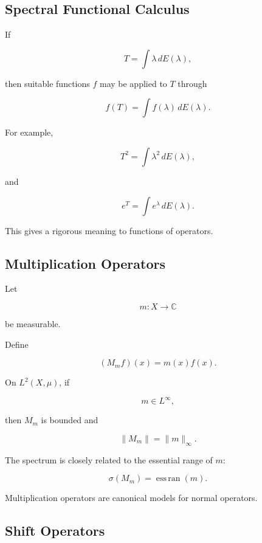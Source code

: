 \subsection{Spectral Functional Calculus}
\label{subsec:spectral-functional-calculus}

If

\[
T
=
\int\lambda\,dE(\lambda),
\]

then suitable functions \(f\) may be applied to \(T\) through

\[
\boxed{
f(T)
=
\int
f(\lambda)\,dE(\lambda).
}
\]

For example,

\[
\boxed{
T^2
=
\int
\lambda^2\,dE(\lambda),
}
\]

and

\[
\boxed{
e^T
=
\int
e^\lambda\,dE(\lambda).
}
\]

This gives a rigorous meaning to functions of operators.

\subsection{Multiplication Operators}
\label{subsec:multiplication-operators}

Let

\[
m:X\to\mathbb{C}
\]

be measurable.

Define

\[
\boxed{
(M_mf)(x)
=
m(x)f(x).
}
\]

On \(L^2(X,\mu)\), if

\[
m\in L^\infty,
\]

then \(M_m\) is bounded and

\[
\boxed{
\|M_m\|
=
\|m\|_\infty.
}
\]

The spectrum is closely related to the essential range of \(m\):

\[
\boxed{
\sigma(M_m)
=
\operatorname{ess\,ran}(m).
}
\]

Multiplication operators are canonical models for normal operators.

\subsection{Shift Operators}
\label{subsec:shift-operators}

